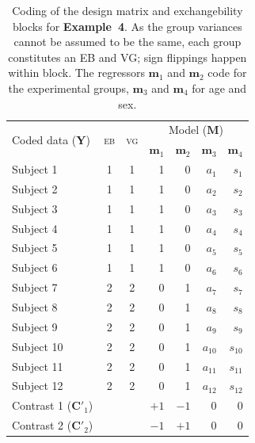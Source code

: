 \begin{table}[!t]
\caption[Coding for Example 4]{Coding of the design matrix and exchangebility blocks for \textbf{Example~4}. As the group variances cannot be assumed to be the same, each group constitutes an EB and VG; sign flippings happen within block. The regressors $\mathbf{m}_1$ and $\mathbf{m}_2$ code for the experimental groups, $\mathbf{m}_3$ and $\mathbf{m}_4$ for age and sex.}
\begin{center}
{\small
\begin{tabular}{@{}lccrrrr@{}}
\toprule
\multirow{2}{*}{\vspace*{-1.7mm}Coded data ($\mathbf{Y}$)} & \multirow{2}{*}{\vspace*{-1.7mm}\textsc{eb}} & \multirow{2}{*}{\vspace*{-1.7mm}\textsc{vg}} & \multicolumn{4}{c}{Model ($\mathbf{M}$)\hspace*{-3mm}}\\
\cmidrule(l){4-7}
& & & $\mathbf{m}_1$ & $\mathbf{m}_2$ & $\mathbf{m}_3$ & $\mathbf{m}_4$\\
\midrule
Subject 1   & 1 & 1 & 1 & 0 & $a_{1}$  & $s_{1}$\\
Subject 2   & 1 & 1 & 1 & 0 & $a_{2}$  & $s_{2}$\\
Subject 3   & 1 & 1 & 1 & 0 & $a_{3}$  & $s_{3}$\\
Subject 4   & 1 & 1 & 1 & 0 & $a_{4}$  & $s_{4}$\\
Subject 5   & 1 & 1 & 1 & 0 & $a_{5}$  & $s_{5}$\\
Subject 6   & 1 & 1 & 1 & 0 & $a_{6}$  & $s_{6}$\\
Subject 7   & 2 & 2 & 0 & 1 & $a_{7}$  & $s_{7}$\\
Subject 8   & 2 & 2 & 0 & 1 & $a_{8}$  & $s_{8}$\\
Subject 9   & 2 & 2 & 0 & 1 & $a_{9}$  & $s_{9}$\\
Subject 10  & 2 & 2 & 0 & 1 & $a_{10}$ & $s_{10}$\\
Subject 11  & 2 & 2 & 0 & 1 & $a_{11}$ & $s_{11}$\\
Subject 12  & 2 & 2 & 0 & 1 & $a_{12}$ & $s_{12}$\\
\midrule
Contrast 1 ($\mathbf{C}'_1$) & & & $+1$ & $-1$ & 0 & 0\\
Contrast 2 ($\mathbf{C}'_2$) & & & $-1$ & $+1$ & 0 & 0\\
\bottomrule
\end{tabular}}
\end{center}
\label{tab:ex_behrensfisher}
\end{table}

